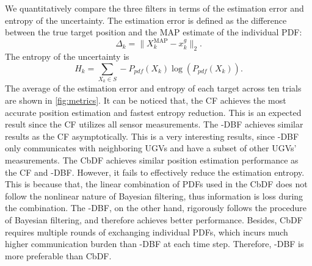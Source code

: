 	We quantitatively compare the three filters in terms of the estimation error and entropy of the uncertainty.
	The estimation error is defined as the difference between the true target position and the MAP estimate of the individual PDF:
	\small\begin{equation*}
		\Delta_k = \|X^\text{MAP}_k-x^g_k\|_2.
	\end{equation*}\normalsize
	The entropy of the uncertainty is
	\small\begin{equation*}
		H_k = \sum\limits_{X_k\in S} -P_{pdf}(X_k)\log(P_{pdf}(X_k)).
	\end{equation*}\normalsize
	The average of the estimation error and entropy of each target across ten trials are shown in \cref{fig:metrics}.
	It can be noticed that, the CF achieves the most accurate position estimation and fastest entropy reduction. 
	This is an expected result since the CF utilizes all sensor measurements.
	The \proto-DBF achieves similar results as the CF asymptotically. 
	This is a very interesting results, since \proto-DBF only communicates with neighboring UGVs and have a subset of other UGVs' measurements.
	The CbDF achieves similar position estimation performance as the CF and \proto-DBF. 
	However, it fails to effectively reduce the estimation entropy.
	This is because that, the linear combination of PDFs used in the CbDF does not follow the nonlinear nature of Bayesian filtering, thus information is loss during the combination.
	The \proto-DBF, on the other hand, rigorously follows the procedure of Bayesian filtering, and therefore achieves better performance.
	\textcolor{\revcol}{Besides,  CbDF requires multiple rounds of exchanging individual PDFs, which incurs much higher communication burden than \proto-DBF at each time step. 
	Therefore, \proto-DBF is more preferable than CbDF.}
	
	
	
		